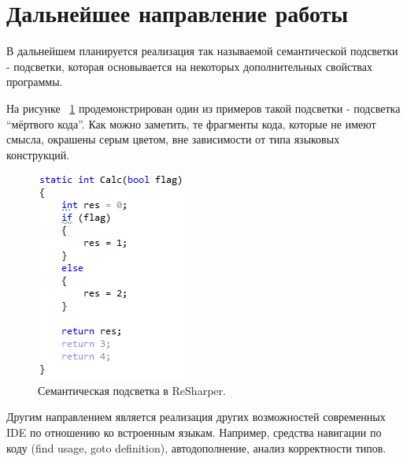 \documentclass{matmex-diploma-custom}
\begin{document}
\section*{Дальнейшее направление работы}

В дальнейшем планируется реализация так называемой семантической подсветки - подсветки, которая основывается на некоторых дополнительных свойствах программы. 

На рисунке ~\ref{dead_code} продемонстрирован один из примеров такой подсветки - подсветка “мёртвого кода”. Как можно заметить, те фрагменты кода, которые не имеют смысла, окрашены серым цветом, вне зависимости от типа языковых конструкций.

\begin{figure}[h]
\centering
\includegraphics{Pictures/dead_code.PNG}
\caption{Семантическая подсветка в ReSharper.}
\label{dead_code}
\end{figure}

Другим направлением является реализация других возможностей современных IDE по отношению ко встроенным языкам. Например, средства навигации по коду (find usage, goto definition), автодополнение, анализ корректности типов. 



\end{document}
